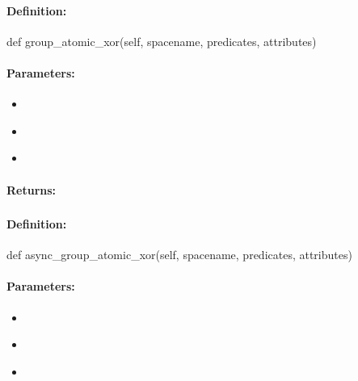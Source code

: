 \paragraph{Definition:}
\begin{pythoncode}
def group_atomic_xor(self, spacename, predicates, attributes)
\end{pythoncode}

\paragraph{Parameters:}
\begin{itemize}[noitemsep]
\item {}\\

\item {}\\

\item {}\\

\end{itemize}

\paragraph{Returns:}


\pagebreak
\subsubsection{}
\label{api:python:async_group_atomic_xor}


\paragraph{Definition:}
\begin{pythoncode}
def async_group_atomic_xor(self, spacename, predicates, attributes)
\end{pythoncode}

\paragraph{Parameters:}
\begin{itemize}[noitemsep]
\item {}\\

\item {}\\

\item {}\\

\end{itemize}

